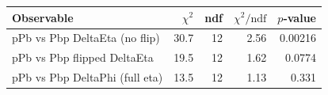 \begin{tabular}{|l|r|r|r|r|}
\hline
Observable & $\chi^2$ & ndf & $\chi^2/\mathrm{ndf}$ & $p$-value \\
\hline
pPb vs Pbp DeltaEta (no flip) & 30.7 & 12 & 2.56 & 0.00216 \\
pPb vs Pbp flipped DeltaEta & 19.5 & 12 & 1.62 & 0.0774 \\
pPb vs Pbp DeltaPhi (full eta) & 13.5 & 12 & 1.13 & 0.331 \\
\hline
\end{tabular}
